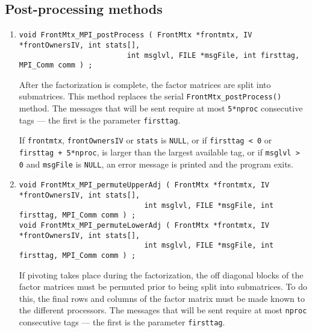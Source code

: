 \subsection{Post-processing methods}
\label{subsection:MPI:proto:postprocess}
\par
\begin{enumerate}
\item
\begin{verbatim}
void FrontMtx_MPI_postProcess ( FrontMtx *frontmtx, IV *frontOwnersIV, int stats[], 
                         int msglvl, FILE *msgFile, int firsttag, MPI_Comm comm ) ;
\end{verbatim}
After the factorization is complete, the factor matrices are 
split into submatrices.
This method replaces the serial {\tt FrontMtx\_postProcess()} method.
The messages that will be sent require at most {\tt 5*nproc} 
consecutive tags --- the first is the parameter {\tt firsttag}.
\par {}
If {\tt frontmtx}, {\tt frontOwnersIV} or {\tt stats} is {\tt NULL}, 
or if {\tt firsttag < 0} or {\tt firsttag + 5*nproc},
is larger than the largest available tag,
or if {\tt msglvl > 0} and {\tt msgFile} is {\tt NULL},
an error message is printed and the program exits.
\item
\begin{verbatim}
void FrontMtx_MPI_permuteUpperAdj ( FrontMtx *frontmtx, IV *frontOwnersIV, int stats[], 
                             int msglvl, FILE *msgFile, int firsttag, MPI_Comm comm ) ;
void FrontMtx_MPI_permuteLowerAdj ( FrontMtx *frontmtx, IV *frontOwnersIV, int stats[], 
                             int msglvl, FILE *msgFile, int firsttag, MPI_Comm comm ) ;
\end{verbatim}
If pivoting takes place during the factorization, the off diagonal
blocks of the factor matrices must be permuted prior to being split
into submatrices.
To do this, the final rows and columns of the factor matrix must be
made known to the different processors.
The messages that will be sent require at most {\tt nproc} 
consecutive tags --- the first is the parameter {\tt firsttag}.
\par {}

\end{enumerate}
